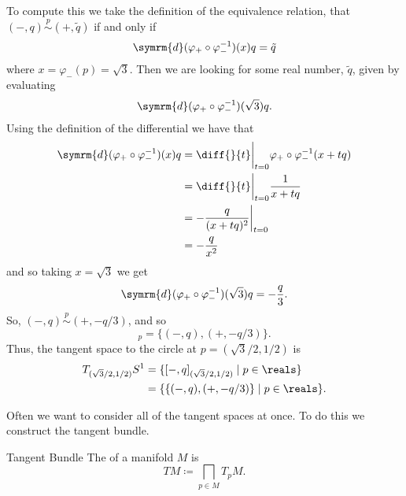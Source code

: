 \documentclass[fleqn]{NotesClass}
\renewcommand{\dl}{\symrm{d}}
\newcommand{\tangrel}[1][p]{\mathrel{\stackrel{\scriptscriptstyle #1}{\sim}}}
\begin{document}
\begin{exm}{}{}
        To compute this we take the definition of the equivalence relation, that \((-, q) \tangrel (+, \tilde{q})\) if and only if
        \begin{equation}
            \dl (\varphi_+ \circ \varphi_-^{-1})(x)q = \tilde{q}
        \end{equation}
        where \(x = \varphi_-(p) = \sqrt{3}\).
        Then we are looking for some real number, \(\tilde{q}\), given by evaluating
        \begin{equation}
            \dl(\varphi_+ \circ \varphi_-^{-1})(\sqrt{3})q.
        \end{equation}
        Using the definition of the differential we have that
        \begin{align}
            \dl(\varphi_+ \circ \varphi_-^{-1})(x)q &= \diff{}{t}\bigg|_{t=0} \varphi_+ \circ \varphi_-^{-1}(x + tq)\\
            &= \diff{}{t}\bigg|_{t=0} \frac{1}{x + tq}\\
            &= -\frac{q}{(x + tq)^2}\bigg|_{t = 0}\\
            &= -\frac{q}{x^2}
        \end{align}
        and so taking \(x = \sqrt{3}\) we get
        \begin{equation}
            \dl(\varphi_+ \circ \varphi_-^{-1})(\sqrt{3})q = -\frac{q}{3}.
        \end{equation}
        So, \((-, q) \tangrel (+, -q/3)\), and so
        \begin{equation}
            [-, q]_p = \{(-, q), (+, -q/3)\}.
        \end{equation}
        Thus, the tangent space to the circle at \(p = (\sqrt{3}/2, 1/2)\) is
        \begin{align}
            T_{(\sqrt{3}/2, 1/2)}S^1 &= \{[-, q]_{(\sqrt{3}/2, 1/2)} \mid p \in \reals\}\\
            &= \{\{(-, q), (+, -q/3)\} \mid p \in \reals\}.
        \end{align}
    \end{exm}
    
    Often we want to consider all of the tangent spaces at once.
    To do this we construct the tangent bundle.
    
    \begin{dfn}{Tangent Bundle}{}
        The  of a manifold \(M\) is
        \begin{equation}
            TM \coloneqq \bigsqcap_{p \in M} T_pM.
        \end{equation}
    \end{dfn}
    
\end{document}
